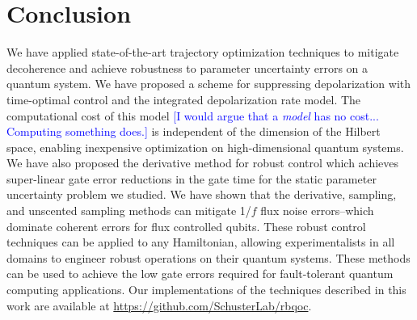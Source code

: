 \section{Conclusion}
We have applied state-of-the-art trajectory
optimization techniques to mitigate decoherence and
achieve robustness to parameter uncertainty
errors on a quantum system.
We have proposed a scheme for suppressing
depolarization with time-optimal
control and the integrated depolarization rate model.
The computational cost of this model \textcolor{blue}{[I would argue that a \emph{model} has no cost... Computing something does.]} is
independent of the dimension of the Hilbert space, enabling
inexpensive optimization on high-dimensional quantum systems.
We have also proposed the derivative method for robust control which achieves
super-linear gate error reductions in the gate time for the static parameter
uncertainty problem we studied.
We have shown that the derivative, sampling, and unscented sampling methods
can mitigate 1/$f$ flux noise errors--which
dominate coherent errors for flux controlled qubits.
These robust control techniques can be applied
to any Hamiltonian,
allowing experimentalists in all domains to engineer robust
operations on their quantum systems.
These methods can be used to achieve the low gate errors
required for fault-tolerant quantum computing applications. Our
implementations of the techniques described in this work are available
at \url{https://github.com/SchusterLab/rbqoc}.
